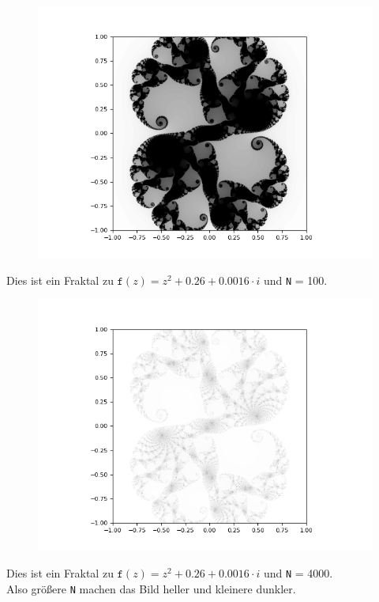 \documentclass[12pt]{scrartcl}
\begin{document}
\begin{figure}[H]
\centering
\includegraphics[scale=0.5]{Elefant1.png}
\caption{}
\label{Elefant1}
\end{figure}

Dies ist ein Fraktal zu $\texttt{f}(z) = z^2 + 0.26 + 0.0016 \cdot i$ und \texttt{N} = 100.\\

\begin{figure}[H]
\centering
\includegraphics[scale=0.5]{Elefant2.png}
\caption{}
\label{Elefant2}
\end{figure}

Dies ist ein Fraktal zu $\texttt{f}(z) = z^2 + 0.26 + 0.0016 \cdot i$ und \texttt{N} = 4000.\\
Also größere \texttt{N} machen das Bild heller und kleinere dunkler.
\end{document}
